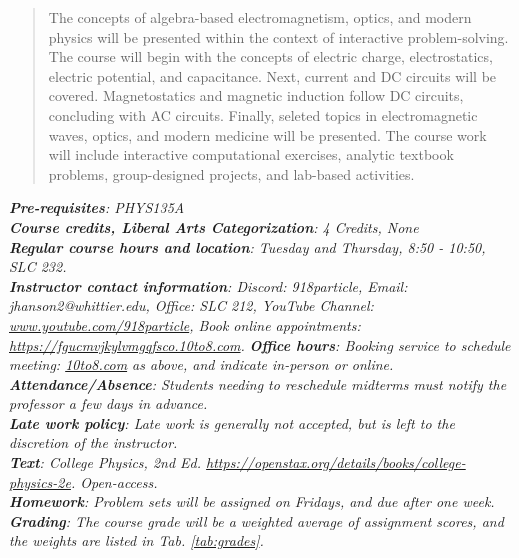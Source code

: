 \documentclass[10pt]{article}
\begin{document}
\maketitle

\begin{abstract}
The concepts of algebra-based electromagnetism, optics, and modern physics will be presented within the context of interactive problem-solving.  The course will begin with the concepts of electric charge, electrostatics, electric potential, and capacitance.  Next, current and DC circuits will be covered.  Magnetostatics and magnetic induction follow DC circuits, concluding with AC circuits.  Finally, seleted topics in electromagnetic waves, optics, and modern medicine will be presented.  The course work will include interactive computational exercises, analytic textbook problems, group-designed projects, and lab-based activities.
\end{abstract}
\noindent
\textit{\textbf{Pre-requisites}: PHYS135A} \\
\textit{\textbf{Course credits, Liberal Arts Categorization}: 4 Credits, None} \\
\textit{\textbf{Regular course hours and location}: Tuesday and Thursday, 8:50 - 10:50, SLC 232.} \\
\textit{\textbf{Instructor contact information}: Discord: 918particle, Email: jhanson2@whittier.edu, Office: SLC 212, YouTube Channel: \url{www.youtube.com/918particle}, Book online appointments: \url{https://fgucmvjkylvmgqfsco.10to8.com}.}
\noindent
\textit{\textbf{Office hours}: Booking service to schedule meeting: \url{10to8.com} as above, and indicate in-person or online.} \\
\textit{\textbf{Attendance/Absence}: Students needing to reschedule midterms must notify the professor a few days in advance.} \\ 
\textit{\textbf{Late work policy}: Late work is generally not accepted, but is left to the discretion of the instructor.} \\
\textit{\textbf{Text}: College Physics, 2nd Ed. \url{https://openstax.org/details/books/college-physics-2e}. Open-access.} \\
\textit{\textbf{Homework}: Problem sets will be assigned on Fridays, and due after one week.} \\
\textit{\textbf{Grading}: The course grade will be a weighted average of assignment scores, and the weights are listed in Tab. \ref{tab:grades}.}
\end{document}
